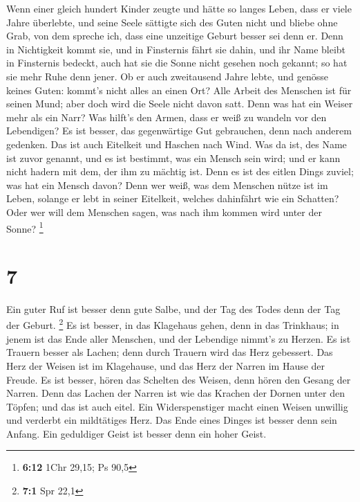  Wenn einer gleich hundert Kinder zeugte und hätte so
langes Leben, dass er viele Jahre überlebte, und seine Seele sättigte
sich des Guten nicht und bliebe ohne Grab, von dem spreche ich, dass
eine unzeitige Geburt besser sei denn er.  Denn in
Nichtigkeit kommt sie, und in Finsternis fährt sie dahin, und ihr Name
bleibt in Finsternis bedeckt,  auch hat sie die Sonne
nicht gesehen noch gekannt; so hat sie mehr Ruhe denn jener.
 Ob er auch zweitausend Jahre lebte, und genösse keines
Guten: kommt's nicht alles an einen Ort?  Alle Arbeit des
Menschen ist für seinen Mund; aber doch wird die Seele nicht davon satt.
 Denn was hat ein Weiser mehr als ein Narr? Was hilft's
den Armen, dass er weiß zu wandeln vor den Lebendigen?  Es
ist besser, das gegenwärtige Gut gebrauchen, denn nach anderem gedenken.
Das ist auch Eitelkeit und Haschen nach Wind.  Was da
ist, des Name ist zuvor genannt, und es ist bestimmt, was ein Mensch
sein wird; und er kann nicht hadern mit dem, der ihm zu mächtig ist.
 Denn es ist des eitlen Dings zuviel; was hat ein Mensch
davon?  Denn wer weiß, was dem Menschen nütze ist im
Leben, solange er lebt in seiner Eitelkeit, welches dahinfährt wie ein
Schatten? Oder wer will dem Menschen sagen, was nach ihm kommen wird
unter der Sonne? \footnote{\textbf{6:12} 1Chr 29,15; Ps 90,5}

\hypertarget{section-2}{%
\section{7}\label{section-2}}

 Ein guter Ruf ist besser denn gute Salbe, und der Tag des
Todes denn der Tag der Geburt. \footnote{\textbf{7:1} Spr 22,1}
 Es ist besser, in das Klagehaus gehen, denn in das
Trinkhaus; in jenem ist das Ende aller Menschen, und der Lebendige
nimmt's zu Herzen.  Es ist Trauern besser als Lachen; denn
durch Trauern wird das Herz gebessert.  Das Herz der
Weisen ist im Klagehause, und das Herz der Narren im Hause der Freude.
 Es ist besser, hören das Schelten des Weisen, denn hören
den Gesang der Narren.  Denn das Lachen der Narren ist wie
das Krachen der Dornen unter den Töpfen; und das ist auch eitel.
 Ein Widerspenstiger macht einen Weisen unwillig und
verderbt ein mildtätiges Herz.  Das Ende eines Dinges ist
besser denn sein Anfang. Ein geduldiger Geist ist besser denn ein hoher
Geist.

